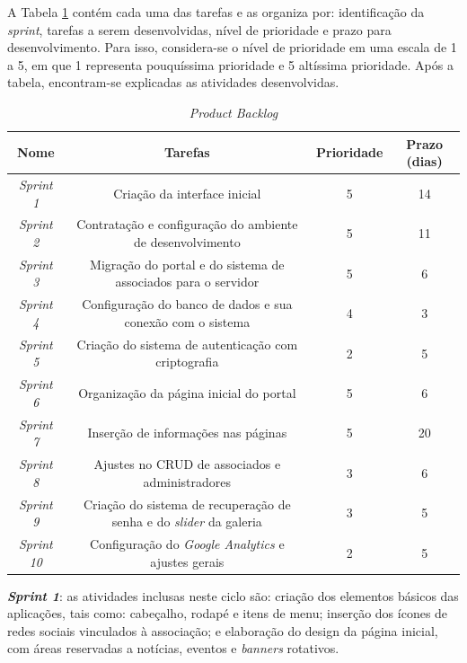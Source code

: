 A Tabela \ref{lista-sprints} contém cada uma das tarefas e as organiza por: identificação da \textit{sprint}, tarefas a serem desenvolvidas, nível de prioridade e prazo para desenvolvimento. Para isso, considera-se o nível de prioridade em uma escala de 1 a 5, em que 1 representa pouquíssima prioridade e 5 altíssima prioridade. Após a tabela, encontram-se explicadas as atividades desenvolvidas.

\begin{table}[h]
\centering
{}
\caption{\textit{Product Backlog}}
\vspace{0.5cm}

\setlength{\extrarowheight}{0.15cm}
\begin{tabular}{c|c|c|c}
 
\textbf{Nome} & \textbf{Tarefas} & \textbf{Prioridade} & \textbf{Prazo (dias)} \\ %
\hline                               %
\textit{Sprint 1} & Criação da interface inicial & 5 & 14  \\
\textit{Sprint 2} & Contratação e configuração do ambiente de desenvolvimento & 5 & 11  \\ %
\textit{Sprint 3} & Migração do portal e do sistema de associados para o servidor & 5 & 6  \\
\textit{Sprint 4} & Configuração do banco de dados e sua conexão com o sistema & 4 & 3  \\
\textit{Sprint 5} & Criação do sistema de autenticação com criptografia & 2 & 5  \\
\textit{Sprint 6} & Organização da página inicial do portal & 5 & 6  \\
\textit{Sprint 7} & Inserção de informações nas páginas & 5 & 20  \\ %
\textit{Sprint 8} & Ajustes no CRUD de associados e administradores & 3 & 6  \\
\textit{Sprint 9} & Criação do sistema de recuperação de senha e do \textit{slider} da galeria & 3 & 5  \\
\textit{Sprint 10} & Configuração do \textit{Google Analytics} e ajustes gerais & 2 & 5 \\
\hline
\end{tabular}
\label{lista-sprints}
\end{table}

\textbf{\textit{Sprint 1}}: as atividades inclusas neste ciclo são: criação dos elementos básicos das aplicações, tais como: cabeçalho, rodapé e itens de menu; inserção dos ícones de redes sociais vinculados à associação; e elaboração do design da página inicial, com áreas reservadas a notícias, eventos e \textit{banners} rotativos.

